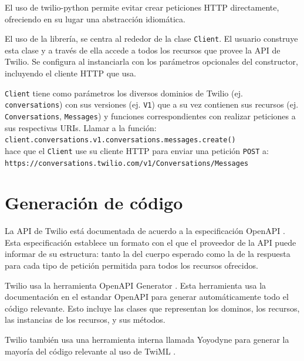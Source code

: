 \documentclass{article}
\begin{document}
El uso de twilio-python permite evitar crear peticiones HTTP directamente,
ofreciendo en su lugar una abstracción idiomática.

\hfill

El uso de la librería, se centra al rededor de la clase \verb|Client|.
El usuario construye esta clase
y a través de ella accede a todos los recursos que provee la API de Twilio.
Se configura al instanciarla con los parámetros opcionales del constructor,
incluyendo el cliente HTTP que usa.

\verb|Client| tiene como parámetros los diversos dominios de Twilio
(ej. \verb|conversations|)
con sus versiones (ej. \verb|V1|)
que a su vez contienen sus recursos
(ej. \verb|Conversations|, \verb|Messages|)
y funciones correspondientes con realizar peticiones
a sus respectivas URIs.
Llamar a la función:
\\ \hspace*{1em} \verb|client.conversations.v1.conversations.messages.create()|
\\hace que el \verb|Client|
use su cliente HTTP para enviar una petición \verb|POST| a:
\\ \hspace*{1em} \verb|https://conversations.twilio.com/v1/Conversations/Messages|

\hfill


\section{Generación de código}

La API de Twilio está documentada
de acuerdo a la especificación OpenAPI
\cite{twilio-openapi}
\cite{twilio-openapi-repo}.
Esta especificación establece un formato
con el que el proveedor de la API
puede informar de su estructura:
tanto la del cuerpo esperado
como la de la respuesta
para cada tipo de petición permitida
para todos los recursos ofrecidos.

Twilio usa la herramienta OpenAPI Generator
\cite{twilio-generated-openapi}.
Esta herramienta usa la documentación en el estandar OpenAPI
para generar automáticamente todo el código relevante.
Esto incluye las clases que representan los dominos,
los recursos, las instancias de los recursos,
y sus métodos.

\hfill

Twilio también usa una herramienta interna llamada Yoyodyne
para generar la mayoría del código relevante al uso de TwiML
\cite{twilio-generated-yoyodyne}.
\end{document}
